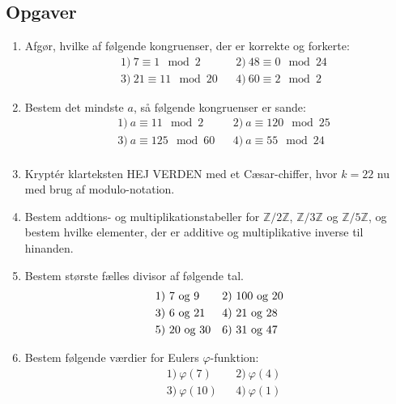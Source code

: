 \documentclass[12pt]{article}
\begin{document}
\subsection*{Opgaver}
\begin{enumerate}[label=\roman*)]
\item Afgør, hvilke af følgende kongruenser, der er korrekte og forkerte:
\begin{align*}
&1) \ 7 \equiv 1 \mod{2}  &&2) \  48 \equiv 0 \mod{24}   \\
&3) \ 21 \equiv 11 \mod{20}  &&4) \ 60 \equiv 2 \mod{2}     
\end{align*}
\item Bestem det mindste $a$, så følgende kongruenser er sande:
\begin{align*}
&1) \ a \equiv 11 \mod{2}  &&2) \ a \equiv 120 \mod{25}    \\
&3) \ a \equiv 125 \mod{60}    &&4) \   a \equiv 55 \mod{24}  \\
\end{align*}
\item Kryptér klarteksten HEJ VERDEN med et Cæsar-chiffer, hvor $k = 22$ nu med brug af modulo-notation.

\item Bestem addtions- og multiplikationstabeller for $\mathbb{Z}/2\mathbb{Z}$, $\mathbb{Z}/3\mathbb{Z}$ og $\mathbb{Z}/5\mathbb{Z}$, og bestem hvilke elementer, der er additive og multiplikative inverse til hinanden.

\item Bestem største fælles divisor af følgende tal.
\begin{align*}
&1)\ 7\textnormal{ og }9   &&2) \ 100 \textnormal{ og } 20   \\
&3)\ 6\textnormal{ og }21   &&4) \ 21 \textnormal{ og }28  \\
&5)\  20\textnormal{ og }30 &&6) \ 31\textnormal{ og }47   \\  
\end{align*}

\item Bestem følgende værdier for Eulers $\varphi$-funktion:
\begin{align*}
&1)\ \varphi(7)  &&2) \  \varphi(4)   \\
&3)\  \varphi(10) &&4) \ \varphi(1)     \\
\end{align*}
\end{enumerate}
\end{document}
